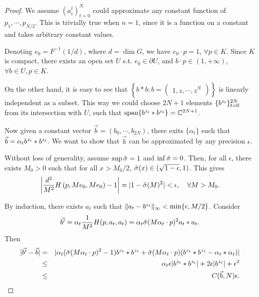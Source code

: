 \begin{proof}
        We assume $(a^t_i)_{t=0}^N$ could approximate any constant function of $p_1, \cdots, p_{N/2}$. This is trivially true when $n=1$, since it is a function on a constant and takes arbitrary constant values.

        Denoting $e_0=F^{-1}(1/d)$, where $d=\dim G$, we have $e_0\cdot p = 1$, $\forall p \in K$. Since $K$ is compact, there exists an open set $U$ s.t. $e_0\in \partial U$, and $b\cdot p \in (1,+\infty)$, $\forall b \in U, p\in K$. 
        
        On the other hand, it is easy to see that $\left\{b*b:b=\begin{pmatrix}
            1,z,\cdots,z^N
        \end{pmatrix}\right\}$ is linearly independent as a subset. This way we could choose $2N+1$ elements $\{b^{z_t}\}_{t=0}^{2N}$ from its intersection with $U$, such that $\text{span}\{b^{z_t}*b^{z_t}\}=\mathbb{C}^{2N+1}$. 

        Now given a constant vector $\Vec{b}=(b_0,\cdots,b_{2N})$, there exits $\{\alpha_t\}$ such that $\Vec{b}=\alpha_t b^{z_t}*b^{z_t}$. We want to show that $\Vec{b}$ can be approximated by any precision $\epsilon$.
        
        Without loss of generality, assume $\sup \Tilde{\sigma}=1$ and  $\inf\Tilde{\sigma}=0$. Then, for all $\epsilon$, there exists $M_0>0$ such that for all $x>M_0/2$, $\Tilde{\sigma}(x)\in(\sqrt{1-\epsilon}, 1)$.  This gives 
        $$\left|\frac{d^2}{M^2} H\left(p, M e_0, Me_0\right)-1\right|=|1-\Tilde{\sigma}(M)^2|<\epsilon,\quad \forall M>M_0.$$

        By induction, there exists $a_t$ such that $\|a_t-b^{z_t}\|_\infty<\min\{\epsilon, M/2\}$. Consider $$\Vec{b'}=\alpha_t \frac{1}{M^2}H(p, a_t, a_t) = \alpha_t  \Tilde{\sigma}(M\alpha_t\cdot p)^2a_t*a_t.$$
        Then \begin{eqnarray}
        |\Vec{b'}-\Vec{b}|&=&|\alpha_t (\Tilde{\sigma}(M\alpha_t\cdot p)^2 -1)b^{z_t}*b^{z_t} 
        + \Tilde{\sigma}(M\alpha_t\cdot p)(b^{z_t}*b^{z_t}-\alpha_t*\alpha_t)|\nonumber \\ \nonumber
        &\leq &\alpha_t \epsilon |b^{z_t}*b^{z_t}| + 2\epsilon |b^{z_t}| + \epsilon ^2 \\ 
        &\leq& C(\Vec{b}, N)\epsilon.
        \end{eqnarray}


\end{proof}
